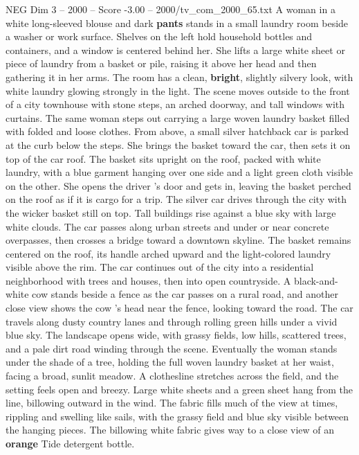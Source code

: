 \begin{textsample}{NEG Dim 3 – 2000 – Score -3.00 – 2000/tv\_com\_2000\_65.txt}  \label{ex:f3_neg_034}
A woman in a white long-sleeved blouse and dark \textbf{pants} stands in a small laundry room beside a washer or work surface.
Shelves on the left hold household bottles and containers, and a window is centered behind her.
She lifts a large white sheet or piece of laundry from a basket or pile, raising it above her head and then gathering it in her arms.
The room has a clean, \textbf{bright}, slightly silvery look, with white laundry glowing strongly in the light.
The scene moves outside to the front of a city townhouse with stone steps, an arched doorway, and tall windows with curtains.
The same woman steps out carrying a large woven laundry basket filled with folded and loose clothes.
From above, a small silver hatchback car is parked at the curb below the steps.
She brings the basket toward the car, then sets it on top of the car roof.
The basket sits upright on the roof, packed with white laundry, with a blue garment hanging over one side and a light green cloth visible on the other.
She opens the driver ’s door and gets in, leaving the basket perched on the roof as if it is cargo for a trip.
The silver car drives through the city with the wicker basket still on top.
Tall buildings rise against a blue sky with large white clouds.
The car passes along urban streets and under or near concrete overpasses, then crosses a bridge toward a downtown skyline.
The basket remains centered on the roof, its handle arched upward and the light-colored laundry visible above the rim.
The car continues out of the city into a residential neighborhood with trees and houses, then into open countryside.
A black-and-white cow stands beside a fence as the car passes on a rural road, and another close view shows the cow ’s head near the fence, looking toward the road.
The car travels along dusty country lanes and through rolling green hills under a vivid blue sky.
The landscape opens wide, with grassy fields, low hills, scattered trees, and a pale dirt road winding through the scene.
Eventually the woman stands under the shade of a tree, holding the full woven laundry basket at her waist, facing a broad, sunlit meadow.
A clothesline stretches across the field, and the setting feels open and breezy.
Large white sheets and a green sheet hang from the line, billowing outward in the wind.
The fabric fills much of the view at times, rippling and swelling like sails, with the grassy field and blue sky visible between the hanging pieces.
The billowing white fabric gives way to a close view of an \textbf{orange} Tide detergent bottle.

\end{textsample}
